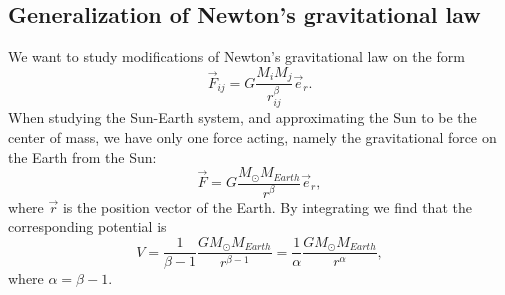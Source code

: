 \documentclass[%
 reprint,
nofootinbib,
aps,
]{revtex4-1}
\begin{document}
\subsection{Generalization of Newton's gravitational law}\label{change_beta_section}

We want to study modifications of Newton's gravitational law on the form
\begin{equation}
\vec{F}_{ij} = G\frac{M_iM_j}{r_{ij}^\beta}\vec{e}_r. \label{newton_betta}
\end{equation}
When studying the Sun-Earth system, and approximating the Sun to be the center of mass, we have only one force acting, namely the gravitational force on the Earth from the Sun:
\begin{equation}\label{eq: beta_force}
\vec{F} = G\frac{M_\odot M_{Earth}}{r^\beta}\vec{e}_r,
\end{equation}
where $\vec{r}$ is the position vector of the Earth. By integrating we find that the corresponding potential is
\begin{equation}
V = \frac{1}{\beta - 1}\frac{GM_\odot M_{Earth}}{r^{\beta - 1}} = \frac{1}{\alpha}\frac{GM_\odot M_{Earth}}{r^{\alpha}},
\end{equation}
where $\alpha = \beta -1$.
\end{document}
